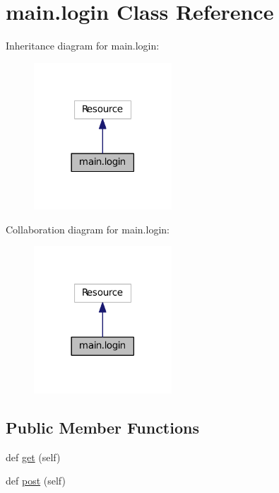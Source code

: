 \hypertarget{classmain_1_1login}{}\section{main.\+login Class Reference}
\label{classmain_1_1login}


Inheritance diagram for main.\+login\+:\nopagebreak
\begin{figure}[H]
\begin{center}
\leavevmode
\includegraphics[width=146pt]{classmain_1_1login__inherit__graph}
\end{center}
\end{figure}


Collaboration diagram for main.\+login\+:\nopagebreak
\begin{figure}[H]
\begin{center}
\leavevmode
\includegraphics[width=146pt]{classmain_1_1login__coll__graph}
\end{center}
\end{figure}
\subsection*{Public Member Functions}
\begin{DoxyCompactItemize}
\item 
def \hyperlink{classmain_1_1login_a842b5fefc13556cbae749a8dc58d8e31}{get} (self)
\item 
def \hyperlink{classmain_1_1login_a71ff3f89aaf0f0c8502577445ab38744}{post} (self)
\end{DoxyCompactItemize}


